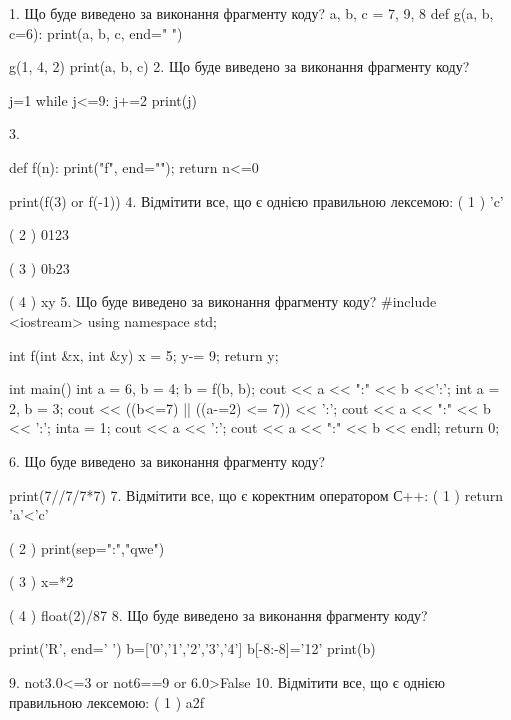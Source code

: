 \documentclass[11pt]{article}
\begin{document}
1. Що буде виведено за виконання фрагменту коду?
a, b, c = 7, 9, 8
def g(a, b, c=6):
    print(a, b, c, end=" ")

g(1, 4, 2)
print(a, b, c)
\vspace{5mm}
2. Що буде виведено за виконання фрагменту коду?

j=1
while j<=9:
    j+=2
print(j)

\vspace{5mm}
3. 

def f(n):
    print("f", end="");
    return n<=0

print(f(3) or f(-1))
\vspace{5mm}
4. %
Відмітити все, що є однією правильною лексемою:
( 1 ) 'c'

( 2 ) 0123

( 3 ) 0b23

( 4 ) xy
\vspace{5mm}
5. Що буде виведено за виконання фрагменту коду?
#include <iostream>
using namespace std;

int f(int &x, int &y){
    x = 5;
    y-= 9;
    return y;
}

int main(){
    int a = 6, b = 4;
    b = f(b, b);
    cout << a << ":" << b <<':';
    {
        int a = 2, b = 3;
        cout << ((b<=7) || ((a-=2) <= 7)) << ':';
        cout << a << ":" << b << ':';
    }
    {
        inta = 1;
        cout << a << ':';
    }
    cout << a << ":" << b << endl;
    return 0;
}

\vspace{5mm}
6. Що буде виведено за виконання фрагменту коду?

print(7//7/7*7)
\vspace{5mm}
7. %
Відмітити все, що є коректним оператором С++:
( 1 ) return 'a'<'c'

( 2 ) print(sep=":","qwe")

( 3 ) x=*2

( 4 ) float(2)/87
\vspace{5mm}
8. Що буде виведено за виконання фрагменту коду?

print('R', end=' ')
b=['0','1','2','3','4']
b[-8:-8]='12'
print(b)

\vspace{5mm}
9. 
not3.0<=3 or not6==9 or 6.0>False\vspace{5mm}
10. %
Відмітити все, що є однією правильною лексемою:
( 1 ) a2f
\end{document}
